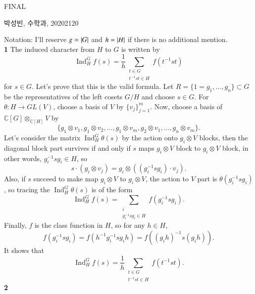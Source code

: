 \documentclass[a4paper, 12pt]{article}
\theoremstyle{Mydefinition}
\theoremstyle{Mytheorem}
\DeclareMathOperator{\Ind}{Ind}
\begin{document}
\thispagestyle{myfirstpage}
\begin{center}
	\Large{FINAL}
\end{center}
박성빈, 수학과, 20202120

Notation: I'll reserve $g=\abs{G}$ and $h=\abs{H}$ if there is no additional mention.\\

\noindent \textbf{1}
The induced character from $H$ to $G$ is written by
\begin{equation}
    \Ind_H^G f(s) = \frac{1}{h}\sum_{\substack{t\in G\\t^{-1}st\in H}} f(t^{-1}st)
\end{equation}
for $s\in G$. Let's prove that this is the valid formula. Let $R = \{1=g_1, \ldots, g_{n}\}\subset G$ be the representatives of the left cosets $G/H$ and choose $s\in G$. For $\theta:H\rightarrow GL(V)$, choose a basis of $V$ by $\{v_j\}_{j=1}^m$. Now, choose a basis of $\mathbb{C}[G]\otimes_{\mathbb{C}[H]}V$ by
\begin{equation}
    \{g_1\otimes v_1, g_1\otimes v_2, \ldots, g_1\otimes v_m, g_2\otimes v_1, \ldots, g_n\otimes v_m\}.
\end{equation}
Let's consider the matrix $\Ind_H^G\theta(s)$ by the action onto $g_i\otimes V$ blocks, then the diagonal block part survives if and only if $s$ maps $g_i\otimes V$ block to $g_i\otimes V$ block, in other words, $g_i^{-1}sg_i\in H$, so
\begin{equation}
    s\cdot (g_i\otimes v_j) = g_i\otimes ((g_{i}^{-1}sg_i)\cdot v_j).
\end{equation}
Also, if $s$ succeed to make map $g_i\otimes V$ to $g_i\otimes V$, the action to $V$ part is $\theta(g_i^{-1}sg_i)$, so tracing the $\Ind_H^G\theta(s)$ is of the form
\begin{equation}
    \Ind_H^G f(s) = \sum_{\substack{i\\g_i^{-1}sg_i\in H}} f(g_i^{-1}sg_i).
\end{equation}
Finally, $f$ is the class function in $H$, so for any $h\in H$,
\begin{equation}
    f(g_i^{-1}sg_i) = f(h^{-1}g_i^{-1}sg_ih) = f((g_ih)^{-1}s(g_ih)).
\end{equation}
It shows that
\begin{equation}
    \Ind_H^G f(s) = \frac{1}{h}\sum_{\substack{t\in G\\t^{-1}st\in H}} f(t^{-1}st).
\end{equation}
\noindent \textbf{2}
\end{document}
